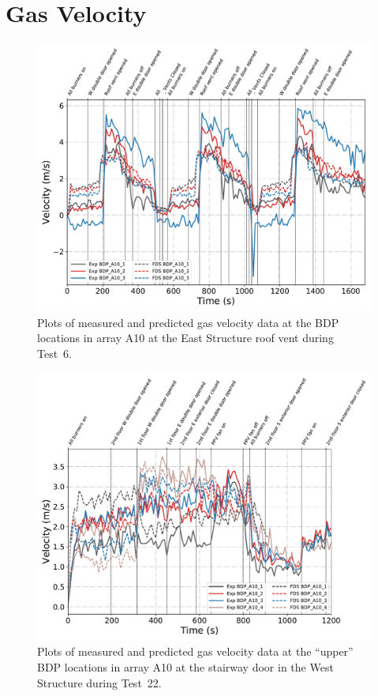 \clearpage
\section{Gas Velocity}
\begin{figure}[!h]
	\centering
	\includegraphics[width=\columnwidth]{Figures/Plots/Validation/Velocity/Test_6_BDP_A10}
	\caption[Plots of measured and predicted gas velocity data at BDP locations in A10 during Test~6.]{Plots of measured and predicted gas velocity data at the BDP locations in array A10 at the East Structure roof vent during Test~6.}
	\label{fig:Test6_BDPs}
\end{figure}

\begin{figure}[!h]
	\centering
	\includegraphics[width=\columnwidth]{Figures/Plots/Validation/Velocity/Test_22_BDP_A10_upper}
	\caption[Plots of measured and predicted gas velocity data at ``upper'' BDP locations in A10 during Test~22.]{Plots of measured and predicted gas velocity data at the ``upper'' BDP locations in array A10 at the stairway door in the West Structure during Test~22.}
	\label{fig:Test22_upper_BDPs}
\end{figure}

